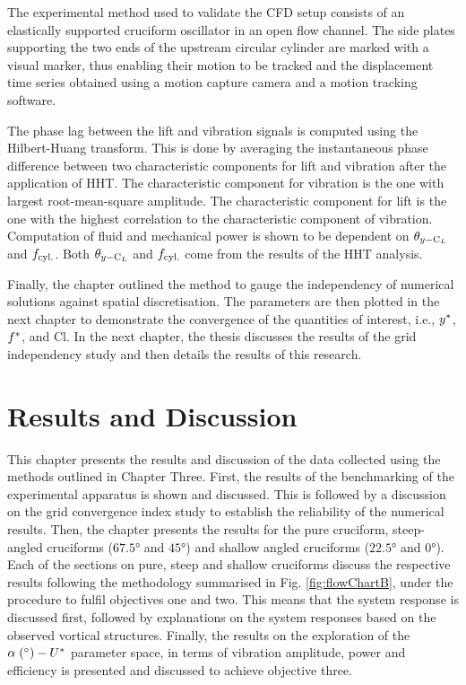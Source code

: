 \documentclass[oneside]{utmthesis}
\begin{document}
The experimental method used to validate the CFD setup consists of an elastically supported cruciform oscillator in an open flow channel. The side plates supporting the two ends of the upstream circular cylinder are marked with a visual marker, thus enabling their motion to be tracked and the displacement time series obtained using a motion capture camera and a motion tracking software.

The phase lag between the lift and vibration signals is computed using the Hilbert-Huang transform. This is done by averaging the instantaneous phase difference between two characteristic components for lift and vibration after the application of HHT. The characteristic component for vibration is the one with largest root-mean-square amplitude. The characteristic component for lift is the one with the highest correlation to the characteristic component of vibration. Computation of fluid and mechanical power is shown to be dependent on $\theta_{y-\text{C}_{L}}$ and $f_{\text{cyl.}}$. Both $\theta_{y-\text{C}_{L}}$ and $f_{\text{cyl.}}$ come from the results of the HHT analysis.

Finally, the chapter outlined the method to gauge the independency of numerical solutions against spatial discretisation. The parameters are then plotted in the next chapter to demonstrate the convergence of the quantities of interest, i.e., $y^{*}$, $f^{*}$, and Cl. In the next chapter, the thesis discusses the results of the grid independency study and then details the results of this research.

\chapter{Results and Discussion} \label{chap:resultsDisc}

This chapter presents the results and discussion of the data collected using the methods outlined in Chapter Three. First, the results of the benchmarking of the experimental apparatus is shown and discussed. This is followed by a discussion on the grid convergence index study to establish the reliability of the numerical results. Then, the chapter presents the results for the pure cruciform, steep-angled cruciforms ($67.5 \si{\degree}$ and $45 \si{\degree}$) and shallow angled cruciforms ($22.5 \si{\degree}$ and $0 \si{\degree}$). Each of the sections on pure, steep and shallow cruciforms discuss the respective results following the methodology summarised in Fig. \ref{fig:flowChartB}, under the procedure to fulfil objectives one and two. This means that the system response is discussed first, followed by explanations on the system responses based on the observed vortical structures. Finally, the results on the exploration of the $\alpha \; (\si{\degree})-\ured$ parameter space, in terms of vibration amplitude, power and efficiency is presented and discussed to achieve objective three.
\end{document}
